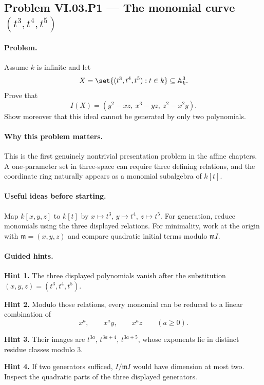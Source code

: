 \subsection*{Problem VI.03.P1 --- The monomial curve \((t^3,t^4,t^5)\)}
\label{prob:vi03-p1}

\paragraph{Problem.}
Assume \(k\) is infinite and let
\[
X=\set{(t^3,t^4,t^5):t\in k}\subseteq\mathbb A_k^3.
\]
Prove that
\[
I(X)=(y^2-xz,\ x^3-yz,\ z^2-x^2y).
\]
Show moreover that this ideal cannot be generated by only two polynomials.

\ifdefined\FullProblemDossiers
\paragraph{Why this problem matters.}
This is the first genuinely nontrivial presentation problem in the affine chapters.  A
one-parameter set in three-space can require three defining relations, and the coordinate
ring naturally appears as a monomial subalgebra of \(k[t]\).

\paragraph{Useful ideas before starting.}
Map \(k[x,y,z]\) to \(k[t]\) by \(x\mapsto t^3\), \(y\mapsto t^4\), \(z\mapsto t^5\).
For generation, reduce monomials using the three displayed relations.  For minimality, work
at the origin with \(\mathfrak m=(x,y,z)\) and compare quadratic initial terms modulo
\(\mathfrak m I\).

\paragraph{Guided hints.}
\textbf{Hint 1.} The three displayed polynomials vanish after the substitution
\((x,y,z)=(t^3,t^4,t^5)\).

\textbf{Hint 2.} Modulo those relations, every monomial can be reduced to a linear
combination of
\[
x^a,\qquad x^a y,\qquad x^a z\qquad(a\ge0).
\]

\textbf{Hint 3.} Their images are \(t^{3a}\), \(t^{3a+4}\), \(t^{3a+5}\), whose exponents
lie in distinct residue classes modulo \(3\).

\textbf{Hint 4.} If two generators sufficed, \(I/\mathfrak m I\) would have dimension at
most two.  Inspect the quadratic parts of the three displayed generators.

